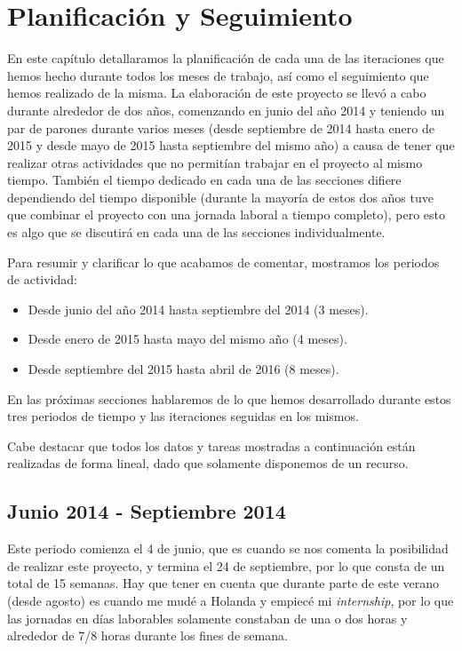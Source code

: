 \chapter{Planificación y Seguimiento}

En este capítulo detallaramos la planificación de cada una de las iteraciones que hemos hecho durante todos los meses de trabajo, así como el seguimiento que hemos realizado de la misma. La elaboración de este proyecto se llevó a cabo durante alrededor de dos años, comenzando en junio del año 2014 y teniendo un par de parones durante varios meses (desde septiembre de 2014 hasta enero de 2015 y desde mayo de 2015 hasta septiembre del mismo año) a causa de tener que realizar otras actividades que no permitían trabajar en el proyecto al mismo tiempo. También el tiempo dedicado en cada una de las secciones difiere dependiendo del tiempo disponible (durante la mayoría de estos dos años tuve que combinar el proyecto con una jornada laboral a tiempo completo), pero esto es algo que se discutirá en cada una de las secciones individualmente.

Para resumir y clarificar lo que acabamos de comentar, mostramos los periodos de actividad:

\begin{itemize}
  \item Desde junio del año 2014 hasta septiembre del 2014 (3 meses).
  \item Desde enero de 2015 hasta mayo del mismo año (4 meses).
  \item Desde septiembre del 2015 hasta abril de 2016 (8 meses).
\end{itemize}

En las próximas secciones hablaremos de lo que hemos desarrollado durante estos tres periodos de tiempo y las iteraciones seguidas en los mismos.

Cabe destacar que todos los datos y tareas mostradas a continuación están realizadas de forma lineal, dado que solamente disponemos de un recurso.

\section{Junio 2014 - Septiembre 2014}

Este periodo comienza el 4 de junio, que es cuando se nos comenta la posibilidad de realizar este proyecto, y termina el 24 de septiembre, por lo que consta de un total de 15 semanas. Hay que tener en cuenta que durante parte de este verano (desde agosto) es cuando me mudé a Holanda y empiecé mi \textit{internship}, por lo que las jornadas en días laborables solamente constaban de una o dos horas y alrededor de 7/8 horas durante los fines de semana.

